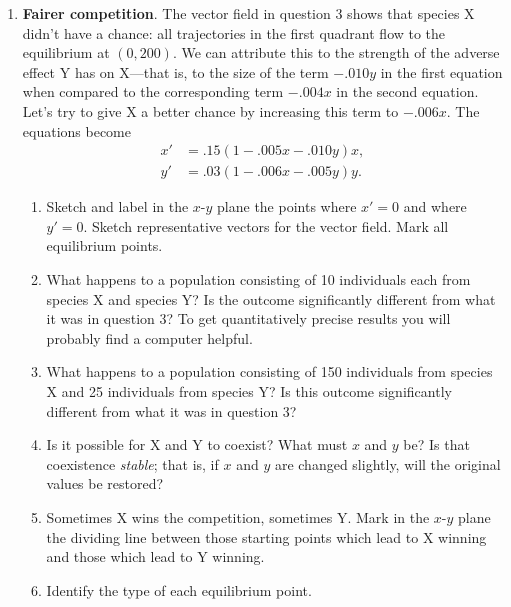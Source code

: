 \begin{enumerate}
\begin{enumerate}
  \item Describe the type of each equilibrium point you found in part
(a).  Is any equilibrium an attractor?


\end{enumerate}
\item \label{`basins'} {\bf Fairer competition}.  The vector field in
question 3 shows that species X didn't have a chance: all trajectories
in the first quadrant flow to the equilibrium at $(0, 200)$.  We can
attribute this to the strength of the adverse effect Y has on X---that
is, to the size of the term $-.010y$ in the first equation when
compared to the corresponding term $-.004x$ in the second equation.
Let's try to give X a better chance by increasing this term to
$-.006x$.  The equations become
\begin{align*}
x' &= .15(1 - .005x - .010y)x, \\
y' &= .03(1 -.006x - .005y)y.
\end{align*}


  \begin{enumerate}
  \item Sketch and label in the $x$-$y$ plane the points where $x' = 0$
and where \mbox{$y' = 0$}.  Sketch representative vectors for the vector
field.  Mark all equilibrium points.

  \item What happens to a population consisting of 10 individuals each
from species X and species Y?  Is the outcome significantly different
from what it was in question 3?  To get quantitatively precise results
you will probably find a computer helpful.

  \item What happens to a population consisting of 150 individuals from
species X and 25 individuals from species Y?  Is this outcome
significantly different from what it was in question 3?

  \item Is it possible for X and Y to coexist?  What must $x$ and $y$ be?
Is that coexistence {\em stable\/}; that is, if $x$ and $y$ are
changed slightly, will the original values be restored?

  \item Sometimes X wins the competition, sometimes Y.  Mark in the
$x$-$y$ plane the dividing line between those starting points which
lead to X winning and those which lead to Y winning.

  \item Identify the type of each equilibrium point.


\end{enumerate}
\end{enumerate}
